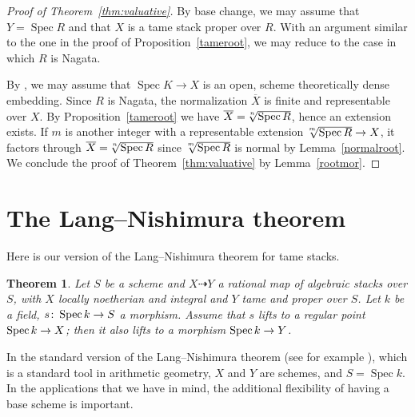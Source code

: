 \documentclass{amsart}
\numberwithin{equation}{section}
\numberwithin{subsection}{section}
\newtheorem{theorem}{Theorem}[section]
\theoremstyle{definition}
\theoremstyle{remark}
\newcommand\arr{\ifinner\to\else\longrightarrow\fi}
\newcommand\spec{\operatorname{Spec}}
\newcommand\radice[2][\relax]{\hspace{-1.5pt}\sqrt[\uproot{2}#1]{#2}}
\begin{document}
\begin{proof}[Proof of Theorem~\ref{thm:valuative}]

By base change, we may assume that $Y=\spec R$ and that $X$ is a tame stack proper over $R$. With an argument similar to the one in the proof of Proposition~\ref{tameroot}, we may reduce to the case in which $R$ is Nagata.

By \cite[Theorem B]{ryd11}, we may assume that $\spec K\to X$ is an open, scheme theoretically dense embedding. Since $R$ is Nagata, the normalization $\overline{X}$ is finite and representable over $X$. By Proposition~\ref{tameroot} we have $\overline{X}=\radice[n]{\spec R}$, hence an extension exists. If $m$ is another integer with a representable extension $\radice[m]{\spec R}\to X$, it factors through $\overline{X}=\radice[n]{\spec R}$ since $\radice[m]{\spec R}$ is normal by Lemma~\ref{normalroot}. We conclude the proof of Theorem~\ref{thm:valuative} by Lemma~\ref{rootmor}.

\end{proof}



\section{The Lang--Nishimura theorem}\label{sec:lang-nishimura}

Here is our version of the Lang--Nishimura theorem for tame stacks.

\begin{theorem}\label{LN}
	Let $S$ be a scheme and $X\dashrightarrow Y$ a rational map of algebraic stacks over $S$, with $X$ locally noetherian and integral and $Y$ tame and proper over $S$. Let $k$ be a field, $s\colon \spec k \arr S$ a morphism. Assume that $s$ lifts to a regular point $\spec k \arr X$; then it also lifts to a morphism $\spec k \arr Y$.
\end{theorem}

In the standard version of the Lang--Nishimura theorem (see for example \cite[Theorem~3.6.11]{poonen-book}), which is a standard tool in arithmetic geometry, $X$ and $Y$ are schemes, and $S = \spec k$. In the applications that we have in mind, the additional flexibility of having a base scheme is important.
	
\end{document}
